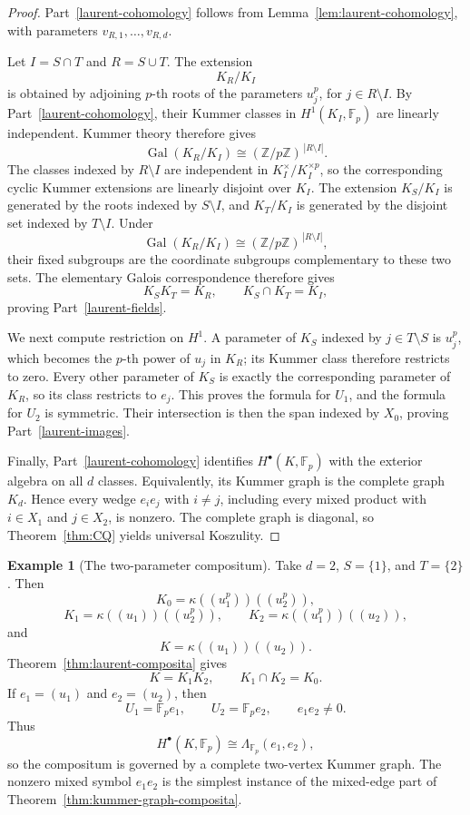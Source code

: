 \documentclass[12pt]{amsart}
\theoremstyle{plain}
\theoremstyle{definition}
\newtheorem{example}[theorem]{Example}
\theoremstyle{remark}
\numberwithin{equation}{section}
\newcommand{\Fp}{\mathbb{F}_p}
\begin{document}
\begin{proof}
Part~\ref{laurent-cohomology} follows from
Lemma~\ref{lem:laurent-cohomology}, with parameters
\(v_{R,1},\dots,v_{R,d}\).

Let \(I=S\cap T\) and \(R=S\cup T\). The extension
\[
K_R/K_I
\]
is obtained by adjoining \(p\)-th roots of the parameters
\(u_j^p\), for \(j\in R\setminus I\). By
Part~\ref{laurent-cohomology}, their Kummer classes in
\(H^1(K_I,\Fp)\) are linearly independent. Kummer theory therefore
gives
\[
\operatorname{Gal}(K_R/K_I)
\cong
(\mathbb Z/p\mathbb Z)^{\,|R\setminus I|}.
\]
The classes indexed by \(R\setminus I\) are independent in
\(K_I^\times/K_I^{\times p}\), so the corresponding cyclic Kummer
extensions are linearly disjoint over \(K_I\). The extension \(K_S/K_I\)
is generated by the roots indexed by \(S\setminus I\), and \(K_T/K_I\) is
generated by the disjoint set indexed by \(T\setminus I\). Under
\[
\operatorname{Gal}(K_R/K_I)\cong(\mathbb Z/p\mathbb Z)^{\,|R\setminus I|},
\]
their fixed subgroups are the coordinate subgroups complementary to these
two sets. The elementary Galois correspondence therefore gives
\[
K_SK_T=K_R,
\qquad
K_S\cap K_T=K_I,
\]
proving Part~\ref{laurent-fields}.

We next compute restriction on \(H^1\). A parameter of \(K_S\)
indexed by \(j\in T\setminus S\) is \(u_j^p\), which becomes the
\(p\)-th power of \(u_j\) in \(K_R\); its Kummer class therefore
restricts to zero. Every other parameter of \(K_S\) is exactly the
corresponding parameter of \(K_R\), so its class restricts to \(e_j\).
This proves the formula for \(U_1\), and the formula for \(U_2\) is
symmetric. Their intersection is then the span indexed by \(X_0\),
proving Part~\ref{laurent-images}.

Finally, Part~\ref{laurent-cohomology} identifies
\(H^\bullet(K,\Fp)\) with the exterior algebra on all \(d\) classes.
Equivalently, its Kummer graph is the complete graph \(K_d\). Hence
every wedge \(e_ie_j\) with \(i\neq j\), including every mixed product
with \(i\in X_1\) and \(j\in X_2\), is nonzero. The complete graph is
diagonal, so Theorem~\ref{thm:CQ} yields universal Koszulity.
\end{proof}

\begin{example}[The two-parameter compositum]
\label{ex:two-parameter}
Take \(d=2\), \(S=\{1\}\), and \(T=\{2\}\). Then
\[
K_0=\kappa((u_1^p))((u_2^p)),
\]
\[
K_1=\kappa((u_1))((u_2^p)),
\qquad
K_2=\kappa((u_1^p))((u_2)),
\]
and
\[
K=\kappa((u_1))((u_2)).
\]
Theorem~\ref{thm:laurent-composita} gives
\[
K=K_1K_2,
\qquad
K_1\cap K_2=K_0.
\]
If \(e_1=(u_1)\) and \(e_2=(u_2)\), then
\[
U_1=\Fp e_1,\qquad
U_2=\Fp e_2,
\qquad
e_1e_2\neq0.
\]
Thus
\[
H^\bullet(K,\Fp)
\cong
\Lambda_{\Fp}(e_1,e_2),
\]
so the compositum is governed by a complete two-vertex Kummer graph. The
nonzero mixed symbol \(e_1e_2\) is the simplest instance of the mixed-edge
part of Theorem~\ref{thm:kummer-graph-composita}.
\end{example}
\end{document}
